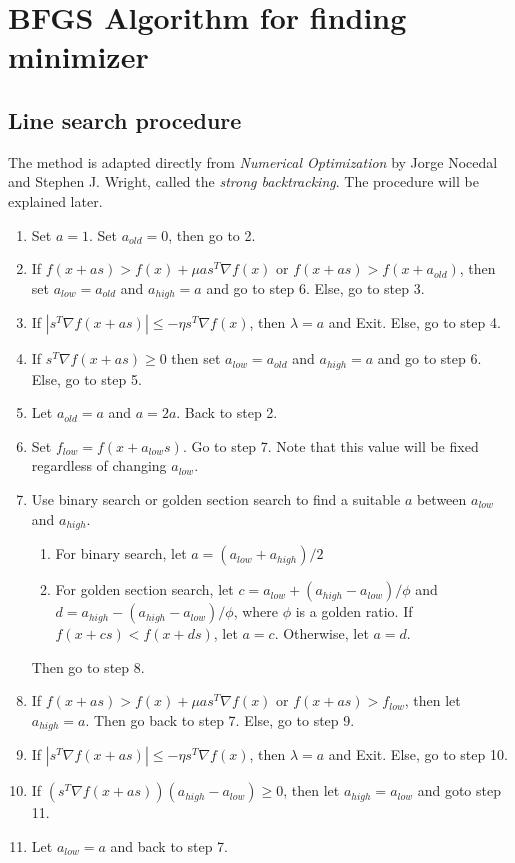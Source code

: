 \documentclass{article}
\begin{document}
\section*{BFGS Algorithm for finding minimizer}

\subsection*{Line search procedure}

The method is adapted directly from \emph{Numerical Optimization} by Jorge Nocedal and Stephen J. Wright, called the \emph{strong backtracking}. The procedure will be explained later.
\begin{enumerate}
    \item Set $a = 1$. Set $a_{old} = 0$, then go to 2.
    \item If $f(x + as) > f(x) + \mu a s^T \nabla f(x)$ or $f(x + a s) > f(x + a_{old})$, then set $a_{low} = a_{old}$ and $a_{high} = a$ and go to step 6. Else, go to step 3.
    \item If $|s^T \nabla f(x + as)| \leq -\eta s^T \nabla f(x)$, then $\lambda = a$ and Exit. Else, go to step 4.
    \item If $s^T \nabla f(x + as) \geq 0$ then set $a_{low} = a_{old}$ and $a_{high} = a$ and go to step 6. Else, go to step 5.
    \item Let $a_{old} = a$ and $a = 2a$. Back to step 2.
    \item Set $f_{low} = f(x + a_{low}s)$. Go to step 7. Note that this value will be fixed regardless of changing $a_{low}$.
    \item Use binary search or golden section search to find a suitable $a$ between $a_{low}$ and $a_{high}$.
    \begin{enumerate}
        \item For binary search, let $a = (a_{low} + a_{high})/2$
        \item For golden section search, let $c = a_{low} + (a_{high} - a_{low})/\phi$ and $d = a_{high} - (a_{high} - a_{low})/\phi$, where $\phi$ is a golden ratio. If $f(x + cs) < f(x + ds)$, let $a = c$. Otherwise, let $a = d$.
    \end{enumerate}
    Then go to step 8.
    \item If $f(x + as) > f(x) + \mu a s^T \nabla f(x)$ or $f(x + a s) > f_{low}$, then let $a_{high} = a$. Then go back to step 7. Else, go to step 9.
    \item If $|s^T \nabla f(x + as)| \leq -\eta s^T \nabla f(x)$, then $\lambda = a$ and Exit. Else, go to step 10.
    \item If $(s^T \nabla f(x + as))(a_{high} - a_{low}) \geq 0$, then let $a_{high} = a_{low}$ and goto step 11.
    \item Let $a_{low} = a$ and back to step 7.
\end{enumerate}
\end{document}
